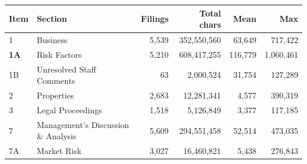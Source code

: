 \begin{tabular}{@{}llrrrr@{}}
\toprule
\textbf{Item} & \textbf{Section} & \textbf{Filings} & \textbf{Total chars} & \textbf{Mean} & \textbf{Max} \\
\midrule
1 & Business & 5,539 & 352,550,560 & 63,649 & 717,422 \\
\textbf{1A} & Risk Factors & 5,210 & 608,417,255 & 116,779 & 1,060,461 \\
1B & Unresolved Staff Comments & 63 & 2,000,524 & 31,754 & 127,289 \\
2 & Properties & 2,683 & 12,281,341 & 4,577 & 390,319 \\
3 & Legal Proceedings & 1,518 & 5,126,849 & 3,377 & 117,185 \\
7 & Management's Discussion \& Analysis & 5,609 & 294,551,458 & 52,514 & 473,035 \\
7A & Market Risk & 3,027 & 16,460,821 & 5,438 & 276,843 \\
\bottomrule
\end{tabular}
